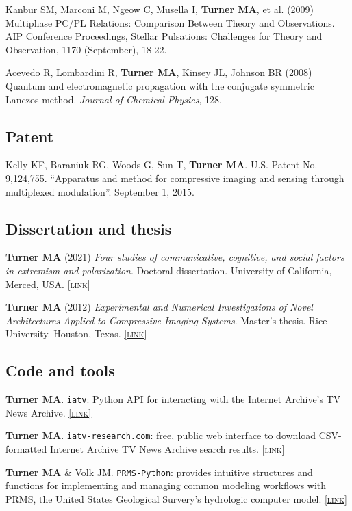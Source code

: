 \documentclass[11pt, letterpaper]{article}
\newcommand{\lurl}[1]{\href{#1}{\scriptsize\textsc{[link]}}}
\begin{document}
    Kanbur SM, Marconi M, Ngeow C, Musella I, \textbf{Turner MA}, et al. (2009) Multiphase PC/PL Relations: Comparison Between Theory and Observations. AIP Conference Proceedings, Stellar Pulsations: Challenges for Theory and Observation, 1170 (September), 18-22.

    Acevedo R, Lombardini R, \textbf{Turner MA}, Kinsey JL, Johnson BR (2008)
    Quantum and electromagnetic propagation with the conjugate symmetric
    Lanczos method. \emph{Journal of Chemical Physics}, 128.

    \subsection{Patent}

  Kelly KF, Baraniuk RG, Woods G, Sun T, \textbf{Turner MA}. U.S. Patent No. 9,124,755. 
  ``Apparatus and method for compressive imaging and sensing through multiplexed modulation''.
  September 1, 2015.

  \subsection{Dissertation and thesis}

  \textbf{Turner MA} (2021) \emph{Four studies of communicative, cognitive,
  and social factors in extremism and polarization}. Doctoral dissertation.
  University of California, Merced, USA. \lurl{https://escholarship.org/uc/item/56h2v4bg}

  \textbf{Turner MA} (2012) \emph{Experimental and Numerical
  Investigations of Novel Architectures Applied to Compressive
Imaging Systems}. Master's thesis. Rice University. Houston,
Texas. \lurl{https://www.researchgate.net/publication/274720620_Experimental_and_Numerical_In vestigations_of_Novel_Architectures_Applied_to_Compressive_Imaging_Systems}

\subsection{Code and tools}

\textbf{Turner MA}. \texttt{iatv}: Python API for interacting with the Internet
Archive's TV News Archive. \lurl{https://github.com/mt-digital/iatv}

\textbf{Turner MA}. \texttt{iatv-research.com}: free, public web interface to download
CSV-formatted Internet Archive TV News Archive search results. \lurl{http://iatv-research.com}

\textbf{Turner MA} \& Volk JM. \texttt{PRMS-Python}: provides intuitive
structures and functions for implementing and managing common modeling
workflows with PRMS, the United States Geological Survery’s hydrologic computer
model. \lurl{https://prms-python.github.io/PRMS-Python/build/html/index.html}
\end{document}
